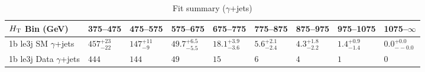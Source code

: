 \documentclass[8pt]{article}
\def\scalht{\mbox{$H_{\rm{T}}$}\xspace}
\newcommand\T{\rule{0pt}{2.6ex}}
\begin{document}
\begin{table}[ht!]
\caption{Fit summary ($\gamma$+jets)}
\label{tab:ensemble-summary}
\centering
\begin{tabular}{ lllllllll }

\hline
\scalht Bin (GeV)       & 375--475                       & 475--575                       & 575--675                       & 675--775                       & 775--875                       & 875--975                       & 975--1075                      & 1075--$\infty$                 \\ [1.000000ex]
\hline
1b le3j SM $\gamma$+jets\T & $457^{+23}_{-22}$              & $147^{+11}_{-9}$               & $49.7^{+6.5}_{-5.5}$           & $18.1^{+3.9}_{-3.6}$           & $5.6^{+2.1}_{-2.4}$            & $4.3^{+1.8}_{-2.2}$            & $1.4^{+0.9}_{-1.4}$            & $0.0^{+0.0}_{--0.0}$           \\ 
1b le3j Data $\gamma$+jets\T & $444$                          & $144$                          & $49$                           & $15$                           & $6$                            & $4$                            & $1$                            & $0$                            \\ 
\hline

\end{tabular}
\end{table}
\end{document}
